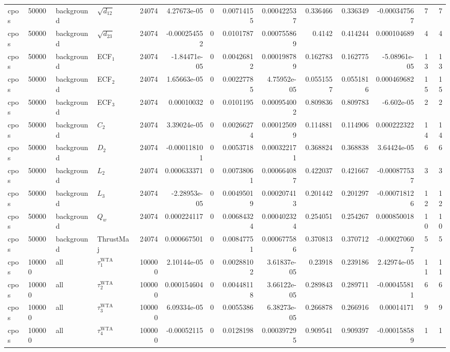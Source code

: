 \begin{landscape}
\begin{longtable}{llll r rrrr rr r rr}
cpos & 50000 & background & $\sqrt{d_{12}}$ & 24074 & 4.27673e-05 & 0 & 0.00714155 & 0.000422537 & 0.336466 & 0.336349 & -0.000347567 & 7 & 7 \\
cpos & 50000 & background & $\sqrt{d_{23}}$ & 24074 & -0.000254552 & 0 & 0.0101787 & 0.000755869 & 0.4142 & 0.414244 & 0.000104689 & 4 & 4 \\
cpos & 50000 & background & ECF$_1$ & 24074 & -1.84471e-05 & 0 & 0.00426812 & 0.000198789 & 0.162783 & 0.162775 & -5.08961e-05 & 13 & 13 \\
cpos & 50000 & background & ECF$_2$ & 24074 & 1.65663e-05 & 0 & 0.00227785 & 4.75952e-05 & 0.0551557 & 0.0551816 & 0.000469682 & 15 & 15 \\
cpos & 50000 & background & ECF$_3$ & 24074 & 0.00010032 & 0 & 0.0101195 & 0.000954002 & 0.809836 & 0.809783 & -6.602e-05 & 2 & 2 \\
cpos & 50000 & background & $C_2$ & 24074 & 3.39024e-05 & 0 & 0.00266274 & 0.000125099 & 0.114881 & 0.114906 & 0.000222322 & 14 & 14 \\
cpos & 50000 & background & $D_2$ & 24074 & -0.000118101 & 0 & 0.0053718 & 0.000322171 & 0.368824 & 0.368838 & 3.64424e-05 & 6 & 6 \\
cpos & 50000 & background & $L_2$ & 24074 & 0.000633371 & 0 & 0.00738061 & 0.000664087 & 0.422037 & 0.421667 & -0.000877537 & 3 & 3 \\
cpos & 50000 & background & $L_3$ & 24074 & -2.28953e-05 & 0 & 0.00495019 & 0.000207413 & 0.201442 & 0.201297 & -0.000718126 & 12 & 12 \\
cpos & 50000 & background & $Q_w$ & 24074 & 0.000224117 & 0 & 0.00684324 & 0.000402324 & 0.254051 & 0.254267 & 0.000850018 & 10 & 10 \\
cpos & 50000 & background & ThrustMaj & 24074 & 0.000667501 & 0 & 0.00847751 & 0.000677586 & 0.370813 & 0.370712 & -0.000270607 & 5 & 5 \\
cpos & 100000 & all & $\tau_1^{\mathrm{WTA}}$ & 100000 & 2.10144e-05 & 0 & 0.00288102 & 3.61837e-05 & 0.23918 & 0.239186 & 2.42974e-05 & 11 & 11 \\
cpos & 100000 & all & $\tau_2^{\mathrm{WTA}}$ & 100000 & 0.000154604 & 0 & 0.00448118 & 3.66122e-05 & 0.289843 & 0.289711 & -0.000455811 & 6 & 6 \\
cpos & 100000 & all & $\tau_3^{\mathrm{WTA}}$ & 100000 & 6.09334e-05 & 0 & 0.0055386 & 6.38273e-05 & 0.266878 & 0.266916 & 0.00014171 & 9 & 9 \\
cpos & 100000 & all & $\tau_4^{\mathrm{WTA}}$ & 100000 & -0.00052115 & 0 & 0.0128198 & 0.000397295 & 0.909541 & 0.909397 & -0.000158589 & 1 & 1 \\

\end{longtable}
\end{landscape}
